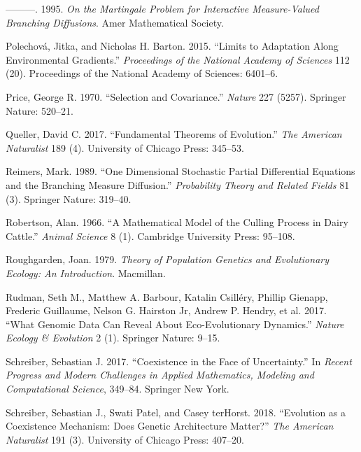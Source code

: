 \documentclass[]{article}
\begin{document}
\leavevmode\hypertarget{ref-edwinarendperkins1995}{}%
---------. 1995. \emph{On the Martingale Problem for Interactive
Measure-Valued Branching Diffusions}. Amer Mathematical Society.

\leavevmode\hypertarget{ref-Polechov2015}{}%
Polechová, Jitka, and Nicholas H. Barton. 2015. ``Limits to Adaptation
Along Environmental Gradients.'' \emph{Proceedings of the National
Academy of Sciences} 112 (20). Proceedings of the National Academy of
Sciences: 6401--6.

\leavevmode\hypertarget{ref-PRICE1970}{}%
Price, George R. 1970. ``Selection and Covariance.'' \emph{Nature} 227
(5257). Springer Nature: 520--21.

\leavevmode\hypertarget{ref-Queller2017}{}%
Queller, David C. 2017. ``Fundamental Theorems of Evolution.'' \emph{The
American Naturalist} 189 (4). University of Chicago Press: 345--53.

\leavevmode\hypertarget{ref-Reimers1989}{}%
Reimers, Mark. 1989. ``One Dimensional Stochastic Partial Differential
Equations and the Branching Measure Diffusion.'' \emph{Probability
Theory and Related Fields} 81 (3). Springer Nature: 319--40.

\leavevmode\hypertarget{ref-Robertson1966}{}%
Robertson, Alan. 1966. ``A Mathematical Model of the Culling Process in
Dairy Cattle.'' \emph{Animal Science} 8 (1). Cambridge University Press:
95--108.

\leavevmode\hypertarget{ref-joanroughgarden1979}{}%
Roughgarden, Joan. 1979. \emph{Theory of Population Genetics and
Evolutionary Ecology: An Introduction}. Macmillan.

\leavevmode\hypertarget{ref-Rudman2017}{}%
Rudman, Seth M., Matthew A. Barbour, Katalin Csilléry, Phillip Gienapp,
Frederic Guillaume, Nelson G. Hairston Jr, Andrew P. Hendry, et al.
2017. ``What Genomic Data Can Reveal About Eco-Evolutionary Dynamics.''
\emph{Nature Ecology \& Evolution} 2 (1). Springer Nature: 9--15.

\leavevmode\hypertarget{ref-Schreiber2017}{}%
Schreiber, Sebastian J. 2017. ``Coexistence in the Face of
Uncertainty.'' In \emph{Recent Progress and Modern Challenges in Applied
Mathematics, Modeling and Computational Science}, 349--84. Springer New
York.

\leavevmode\hypertarget{ref-Schreiber2018}{}%
Schreiber, Sebastian J., Swati Patel, and Casey terHorst. 2018.
``Evolution as a Coexistence Mechanism: Does Genetic Architecture
Matter?'' \emph{The American Naturalist} 191 (3). University of Chicago
Press: 407--20.
\end{document}
